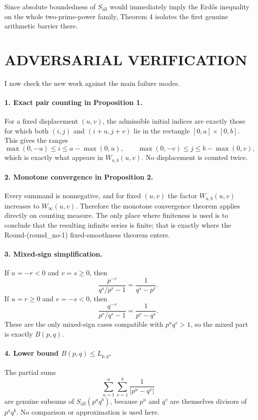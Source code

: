 Since absolute boundedness of \(S_{\mathrm{all}}\) would immediately imply the Erd\H{o}s inequality on the whole two-prime-power family,
Theorem 4 isolates the first genuine arithmetic barrier there.

\section{ADVERSARIAL VERIFICATION}

I now check the new work against the main failure modes.

\paragraph{1. Exact pair counting in Proposition 1.}
For a fixed displacement \((u,v)\), the admissible initial indices are exactly those for which both
\((i,j)\) and \((i+u,j+v)\) lie in the rectangle \([0,a]\times[0,b]\). This gives the ranges
\[
\max(0,-u)\le i\le a-\max(0,u),
\qquad
\max(0,-v)\le j\le b-\max(0,v),
\]
which is exactly what appears in \(W_{a,b}(u,v)\). No displacement is counted twice.

\paragraph{2. Monotone convergence in Proposition 2.}
Every summand is nonnegative, and for fixed \((u,v)\) the factor \(W_{a,b}(u,v)\) increases to \(W_{\infty}(u,v)\). Therefore the monotone convergence theorem applies directly on counting measure. The only place where finiteness is used is to conclude that the resulting infinite series is finite; that is exactly where the Round-(round\_no-1) fixed-smoothness theorem enters.

\paragraph{3. Mixed-sign simplification.}
If \(u=-r<0\) and \(v=s\ge 0\), then
\[
\frac{p^{-r}}{q^s/p^r-1}=\frac{1}{q^s-p^r}.
\]
If \(u=r\ge 0\) and \(v=-s<0\), then
\[
\frac{q^{-s}}{p^r/q^s-1}=\frac{1}{p^r-q^s}.
\]
These are the only mixed-sign cases compatible with \(p^u q^v>1\), so the mixed part is exactly \(B(p,q)\).

\paragraph{4. Lower bound \(B(p,q)\le L_{p,q}\).}
The partial sums
\[
\sum_{u=1}^{a}\sum_{v=1}^{b}\frac{1}{|p^u-q^v|}
\]
are genuine subsums of \(S_{\mathrm{all}}(p^a q^b)\), because \(p^u\) and \(q^v\) are themselves divisors of \(p^a q^b\). No comparison or approximation is used here.

